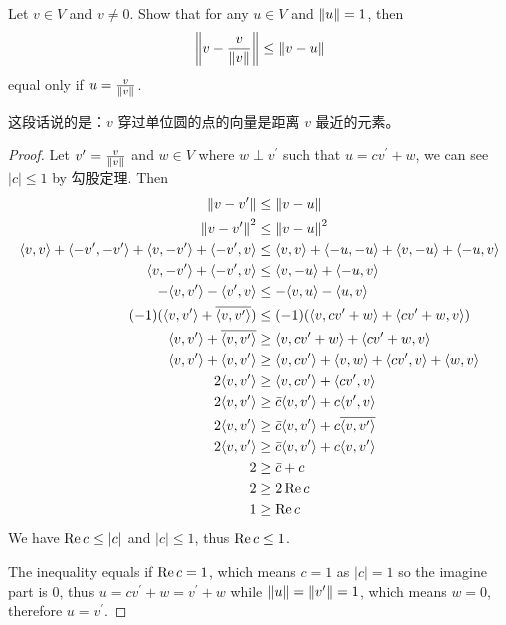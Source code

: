 \documentclass[../main.tex]{subfiles}
\begin{document}
\setcounter{exercise}{13}
\begin{exercise}
  Let $v \in V$ and $v \neq 0$.
  Show that for any $u \in V$ and $\left\Vert u \right\Vert = 1$, then
  \[
  \left\Vert v - \frac{v}{\left\Vert v \right\Vert} \right\Vert \le \left\Vert v - u \right\Vert
  \]
  equal only if $u = \frac{v}{\left\Vert v \right\Vert}$.

  这段话说的是：$v$ 穿过单位圆的点的向量是距离 $v$ 最近的元素。
\end{exercise}
\begin{proof}
  Let $v^\prime = \frac{v}{\left\Vert v \right\Vert}$ and $w \in V$ where $w \perp v^\prime$ such that $u = cv^\prime + w$,
  we can see $|c| \le 1$ by 勾股定理. Then
  \begin{align*}
    \left\Vert v - v^\prime \right\Vert & \le \left\Vert v - u \right\Vert \\
    \left\Vert v - v^\prime \right\Vert^2 & \le \left\Vert v - u \right\Vert^2 \\
    \langle v , v\rangle + \langle -v^\prime , -v^\prime\rangle + \langle v , -v^\prime\rangle + \langle -v^\prime , v\rangle & \le \langle v , v\rangle + \langle -u , -u\rangle + \langle v , -u\rangle + \langle -u , v\rangle \\
    \langle v , -v^\prime\rangle + \langle -v^\prime , v\rangle & \le \langle v , -u\rangle + \langle -u , v\rangle \\
    - \langle v , v^\prime\rangle - \langle v^\prime , v\rangle & \le - \langle v , u\rangle - \langle u , v\rangle \\
    (-1) (\langle v , v^\prime\rangle + \overline{\langle v , v^\prime\rangle}) & \le (-1) (\langle v , cv^\prime + w\rangle + \langle cv^\prime + w , v\rangle) \\
    \langle v , v^\prime\rangle + \overline{\langle v , v^\prime\rangle} & \ge \langle v , cv^\prime + w\rangle + \langle cv^\prime + w , v\rangle \\
    \langle v , v^\prime\rangle + \langle v , v^\prime\rangle & \ge \langle v , cv^\prime\rangle + \langle v , w\rangle + \langle cv^\prime , v\rangle + \langle w , v\rangle \\
    2 \langle v , v^\prime\rangle & \ge \langle v , cv^\prime\rangle + \langle cv^\prime , v\rangle \\
    2 \langle v , v^\prime\rangle & \ge \bar{c} \langle v , v^\prime\rangle + c \langle v^\prime , v\rangle \\
    2 \langle v , v^\prime\rangle & \ge \bar{c} \langle v , v^\prime\rangle + c \overline{\langle v , v^\prime\rangle} \\
    2 \langle v , v^\prime\rangle & \ge \bar{c} \langle v , v^\prime\rangle + c \langle v , v^\prime\rangle \\
    2 & \ge \bar{c} + c \\
    2 & \ge 2 \operatorname{Re} c \\
    1 & \ge \operatorname{Re} c \\
  \end{align*}
  We have $\operatorname{Re} c \le |c|$ and $|c| \le 1$, thus $\operatorname{Re} c \le 1$.

  The inequality equals if $\operatorname{Re} c = 1$, which means $c = 1$ as $|c| = 1$ so the imagine part is $0$,
  thus $u = cv^\prime + w = v^\prime + w$ while $\left\Vert u \right\Vert = \left\Vert v^\prime \right\Vert = 1$, which means $w = 0$,
  therefore $u = v^\prime$.
\end{proof}
\end{document}
